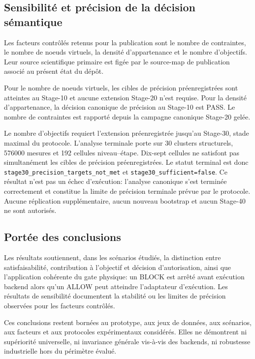 \subsection{Sensibilité et précision de la décision sémantique}

Les facteurs contrôlés retenus pour la publication sont le nombre de
contraintes, le nombre de noeuds virtuels, la densité d'appartenance
et le nombre d'objectifs. Leur source scientifique primaire est
figée par le source-map de publication associé au présent état du
dépôt.

Pour le nombre de noeuds virtuels, les cibles de précision
préenregistrées sont atteintes au Stage-10 et aucune extension
Stage-20 n'est requise. Pour la densité d'appartenance, la décision
canonique de précision au Stage-10 est PASS. Le nombre de contraintes
est rapporté depuis la campagne canonique Stage-20 gelée.

Le nombre d'objectifs requiert l'extension préenregistrée jusqu'au
Stage-30, stade maximal du protocole. L'analyse terminale porte sur
30 clusters structurels, 576000 mesures et 192 cellules
niveau--étape. Dix-sept cellules ne satisfont pas simultanément les
cibles de précision préenregistrées. Le statut terminal est donc
\texttt{stage30\_precision\_targets\_not\_met} et
\texttt{stage30\_sufficient=false}. Ce résultat n'est pas un échec
d'exécution: l'analyse canonique s'est terminée correctement et
constitue la limite de précision terminale prévue par le protocole.
Aucune réplication supplémentaire, aucun nouveau bootstrap et aucun
Stage-40 ne sont autorisés.

\subsection{Portée des conclusions}

Les résultats soutiennent, dans les scénarios étudiés, la distinction
entre satisfaisabilité, contribution à l'objectif et décision
d'autorisation, ainsi que l'application cohérente du gate physique:
un BLOCK est arrêté avant exécution backend alors qu'un ALLOW peut
atteindre l'adaptateur d'exécution. Les résultats de sensibilité
documentent la stabilité ou les limites de précision observées pour
les facteurs contrôlés.

Ces conclusions restent bornées au prototype, aux jeux de données,
aux scénarios, aux facteurs et aux protocoles expérimentaux
considérés. Elles ne démontrent ni supériorité universelle, ni
invariance générale vis-à-vis des backends, ni robustesse
industrielle hors du périmètre évalué.
